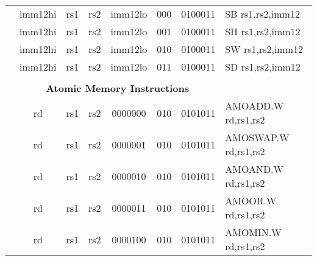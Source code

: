 \begin{table}[p]
\begin{small}
\begin{center}
\begin{tabular}{rccccccccccl}
&
\multicolumn{1}{|c|}{imm12hi} &
\multicolumn{1}{c|}{rs1} &
\multicolumn{1}{c|}{rs2} &
\multicolumn{4}{c|}{imm12lo} &
\multicolumn{2}{c|}{000} &
\multicolumn{1}{c|}{0100011} & SB rs1,rs2,imm12 \\
\cline{2-11}
  

&
\multicolumn{1}{|c|}{imm12hi} &
\multicolumn{1}{c|}{rs1} &
\multicolumn{1}{c|}{rs2} &
\multicolumn{4}{c|}{imm12lo} &
\multicolumn{2}{c|}{001} &
\multicolumn{1}{c|}{0100011} & SH rs1,rs2,imm12 \\
\cline{2-11}
  

&
\multicolumn{1}{|c|}{imm12hi} &
\multicolumn{1}{c|}{rs1} &
\multicolumn{1}{c|}{rs2} &
\multicolumn{4}{c|}{imm12lo} &
\multicolumn{2}{c|}{010} &
\multicolumn{1}{c|}{0100011} & SW rs1,rs2,imm12 \\
\cline{2-11}
  

&
\multicolumn{1}{|c|}{imm12hi} &
\multicolumn{1}{c|}{rs1} &
\multicolumn{1}{c|}{rs2} &
\multicolumn{4}{c|}{imm12lo} &
\multicolumn{2}{c|}{011} &
\multicolumn{1}{c|}{0100011} & SD rs1,rs2,imm12 \\
\cline{2-11}
  

&
\multicolumn{10}{c}{} & \\
&
\multicolumn{10}{c}{\bf Atomic Memory Instructions} & \\
\cline{2-11}
  

&
\multicolumn{1}{|c|}{rd} &
\multicolumn{1}{c|}{rs1} &
\multicolumn{1}{c|}{rs2} &
\multicolumn{4}{c|}{0000000} &
\multicolumn{2}{c|}{010} &
\multicolumn{1}{c|}{0101011} & AMOADD.W rd,rs1,rs2 \\
\cline{2-11}
  

&
\multicolumn{1}{|c|}{rd} &
\multicolumn{1}{c|}{rs1} &
\multicolumn{1}{c|}{rs2} &
\multicolumn{4}{c|}{0000001} &
\multicolumn{2}{c|}{010} &
\multicolumn{1}{c|}{0101011} & AMOSWAP.W rd,rs1,rs2 \\
\cline{2-11}
  

&
\multicolumn{1}{|c|}{rd} &
\multicolumn{1}{c|}{rs1} &
\multicolumn{1}{c|}{rs2} &
\multicolumn{4}{c|}{0000010} &
\multicolumn{2}{c|}{010} &
\multicolumn{1}{c|}{0101011} & AMOAND.W rd,rs1,rs2 \\
\cline{2-11}
  

&
\multicolumn{1}{|c|}{rd} &
\multicolumn{1}{c|}{rs1} &
\multicolumn{1}{c|}{rs2} &
\multicolumn{4}{c|}{0000011} &
\multicolumn{2}{c|}{010} &
\multicolumn{1}{c|}{0101011} & AMOOR.W rd,rs1,rs2 \\
\cline{2-11}
  

&
\multicolumn{1}{|c|}{rd} &
\multicolumn{1}{c|}{rs1} &
\multicolumn{1}{c|}{rs2} &
\multicolumn{4}{c|}{0000100} &
\multicolumn{2}{c|}{010} &
\multicolumn{1}{c|}{0101011} & AMOMIN.W rd,rs1,rs2 \\
\cline{2-11}
  


\end{tabular}
\end{center}
\end{small}
\end{table}
